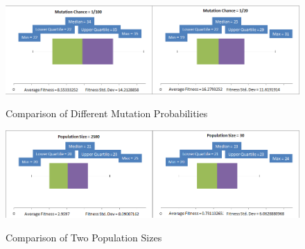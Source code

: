 \documentclass[]{report}
\begin{document}
\begin{figure}
	\centering
	\includegraphics[width=\textwidth]{figures/boxplots/mutationChance.png}
	\label{BPmutationChance}
	\caption{Comparison of Different Mutation Probabilities}
\end{figure}

\begin{figure}
	\centering
	\includegraphics[width=\textwidth]{figures/boxplots/populationSize.png}
	\label{BPpopulationSize}
	\caption{Comparison of Two Population Sizes}
\end{figure}




\end{document}
